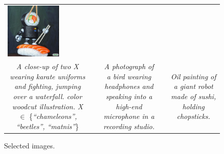 \begin{figure}[ht!]
\begin{adjustwidth}{-0.8in}{-0.5in}
\begin{tabular}{cccccccccccccccccccc}
\multicolumn{2}{c}{\includegraphics[width=\threebythreecolwidth\textwidth]{figures/cherries/sushi_robot_8.jpg}} \\

\multicolumn{6}{p{\thirdcolwidth\textwidth}}{{\tiny \textit{A close-up of two X wearing karate uniforms and fighting, jumping over a waterfall. color woodcut illustration.} \textit{X} $\in$ \{\textit{``chameleons'', ``beetles'', ``matnis''}\}}} &&
\multicolumn{6}{p{\thirdcolwidth\textwidth}}{{\tiny \textit{A photograph of a bird wearing headphones and speaking into a high-end microphone in a recording studio.}}} &&
\multicolumn{6}{p{\thirdcolwidth\textwidth}}{{\tiny \textit{Oil painting of a giant robot made of sushi, holding chopsticks.}}} \\
\end{tabular}
\end{adjustwidth}
\caption{Selected \bdraw images.}
\label{figs:appendix_cherry2}
\end{figure}
